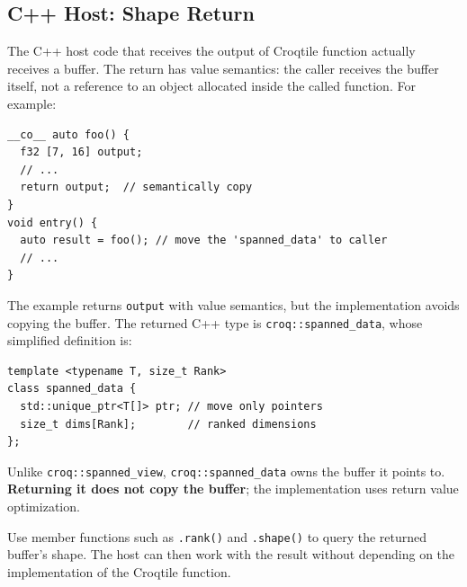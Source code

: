 \subsection*{C++ Host: Shape Return}

The C++ host code that receives the output of Croqtile function actually receives a buffer. The return has value semantics: the caller receives the buffer itself, not a reference to an object allocated inside the called function. For example:

\begin{lstlisting}[language=croqtile,caption={Returning a shaped buffer}]
__co__ auto foo() {
  f32 [7, 16] output;
  // ...
  return output;  // semantically copy
}
void entry() {
  auto result = foo(); // move the 'spanned_data' to caller
  // ...
}
\end{lstlisting}

The example returns \texttt{output} with value semantics, but the implementation avoids copying the buffer. The returned C++ type is \texttt{croq:\allowbreak{}:\allowbreak{}spanned\_\allowbreak{}data}, whose simplified definition is:

\begin{lstlisting}[language={},caption={The host-side result wrapper}]
template <typename T, size_t Rank>
class spanned_data {
  std::unique_ptr<T[]> ptr; // move only pointers
  size_t dims[Rank];        // ranked dimensions
};
\end{lstlisting}

Unlike \texttt{croq:\allowbreak{}:\allowbreak{}spanned\_\allowbreak{}view}, \texttt{croq:\allowbreak{}:\allowbreak{}spanned\_\allowbreak{}data} owns the buffer it points to. \textbf{Returning it does not copy the buffer}; the implementation uses return value optimization.

Use member functions such as \texttt{.rank()} and \texttt{.shape()} to query the returned buffer's shape. The host can then work with the result without depending on the implementation of the Croqtile function.
